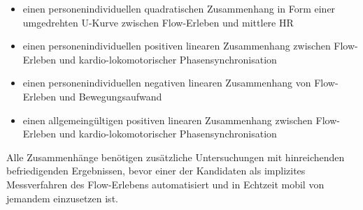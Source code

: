 \begin{itemize}
	\item einen personenindividuellen quadratischen Zusammenhang in Form einer umgedrehten U-Kurve zwischen Flow-Erleben und mittlere HR
	\item einen personenindividuellen positiven linearen Zusammenhang zwischen Flow-Erleben und kardio-lokomotorischer Phasensynchronisation
	\item einen personenindividuellen negativen linearen Zusammenhang von Flow-Erleben und Bewegungsaufwand
	\item einen allgemeingültigen positiven linearen Zusammenhang zwischen Flow-Erleben und kardio-lokomotorischer Phasensynchronisation
\end{itemize}

Alle Zusammenhänge benötigen zusätzliche Untersuchungen mit hinreichenden befriedigenden Ergebnissen, bevor einer der Kandidaten als implizites Messverfahren des Flow-Erlebens automatisiert und in Echtzeit mobil von jemandem einzusetzen ist. 